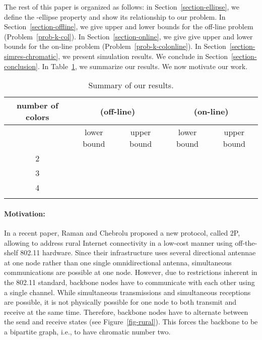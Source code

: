 \documentclass[pdftex,leqno,fleqn,12pts]{llncs}
\begin{document}
The rest of this paper is organized as follows: in Section~\ref{section-ellipse}, we define the -ellipse property and show its relationship to our problem. In Section~\ref{section-offline}, we give upper and lower bounds for the off-line problem (Problem~\ref{prob-k-col}). In Section~\ref{section-online}, we give give upper and lower bounds for the on-line problem (Problem~\ref{prob-k-colonline}). In Section~\ref{section-simres-chromatic}, we present simulation results. We conclude in Section~\ref{section-conclusion}. In Table~\ref{tab-summary}, we summarize our results. We now motivate our work.



\begin{table}
\begin{center}
\begin{tabular}{|c|c|c|c|c|}\hline
number of colors & 
         \multicolumn{2}{c|}{ (off-line)} & 
         \multicolumn{2}{c|}{ (on-line)} \\ 
\hline 
    & lower bound & upper bound & lower bound   & upper bound  \\ 
\hline  
2      &          &          &            &         \\ 
\hline 
3      &          &          &   & \\ 
\hline 
4      &   &   &   &  \\ 
\hline 
   &  &  &  & \\
\hline
\end{tabular}
\end{center}
\caption{Summary of our results.}
\label{tab-summary}
\end{table}


\paragraph{Motivation:} 
In a recent paper, Raman and Chebrolu \cite{raman05} proposed a new
protocol, called 2P, allowing to address rural Internet connectivity
in a low-cost manner using off-the-shelf 802.11 hardware. Since
their infrastructure uses several directional antennae at one node
rather than one single omnidirectional antenna, simultaneous
communications are possible at one node. However, due to
restrictions inherent in the 802.11 standard, backbone nodes have to
communicate with each other using a single channel. While
simultaneous transmissions and simultaneous receptions are 
possible, it is not physically possible for one node to both
transmit and receive at the same time. Therefore, backbone nodes
have to alternate between the send and receive states (see
Figure~\ref{fig-rural}). This forces the backbone to be a bipartite
graph, i.e., to have chromatic number two.
\end{document}
